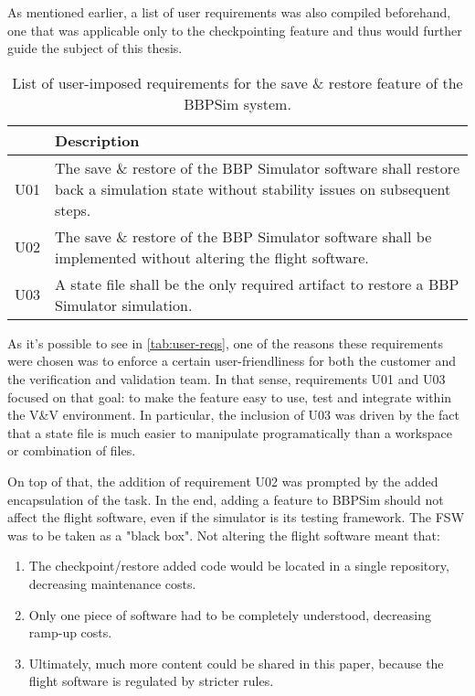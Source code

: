 {As mentioned earlier, a list of user requirements was also compiled beforehand, one that was applicable only to the checkpointing feature and thus would further guide the subject of this thesis. 

\begin{table}[htbp]
	\vspace{12pt}
	\centering
	\begin{tabularx}{\linewidth}{>{\centering}p{3cm} X}
		\toprule
		{\bfseries Requirement\newline Number} & \textbf{Description}\\
		\midrule
		U01 & {The save \& restore of the BBP Simulator software shall restore back a simulation state without stability issues on subsequent steps.}\\
		\midrule
		U02 & {The save \& restore of the BBP Simulator software shall be implemented without altering the flight software.}\\
		\midrule
		U03 & {A state file shall be the only required artifact to restore a BBP Simulator simulation.}\\
		\bottomrule
	\end{tabularx}
	\caption{List of user-imposed requirements for the save \& restore feature of the \gls{BBPSim} system.}
	\label{tab:user-reqs}
\end{table}

As it's possible to see in \autoref{tab:user-reqs}, one of the reasons these requirements were chosen was to enforce a certain user-friendliness for both the customer and the verification and validation team. In that sense, requirements U01 and U03 focused on that goal: to make the feature easy to use, test and integrate within the V\&V environment. In particular, the inclusion of U03 was driven by the fact that a state file is much easier to manipulate programatically than a workspace or combination of files.

On top of that, the addition of requirement U02 was prompted by the added encapsulation of the task. In the end, adding a feature to \gls{BBPSim} should not affect the flight software, even if the simulator is its testing framework. The FSW was to be taken as a "black box". Not altering the flight software meant that:
\begin{enumerate}
	\item The checkpoint/restore added code would be located in a single repository, decreasing maintenance costs.
	\item Only one piece of software had to be completely understood, decreasing ramp-up costs.
	\item Ultimately, much more content could be shared in this paper, because the flight software is regulated by stricter rules.
\end{enumerate}

}
